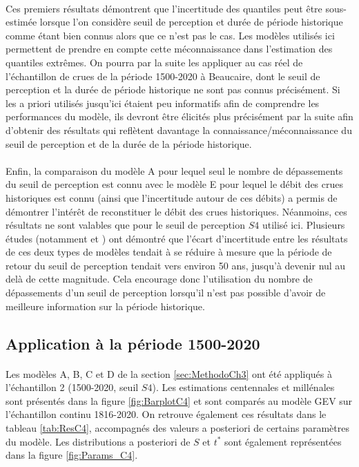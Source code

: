 \documentclass[11pt]{article}
\begin{document}
	\paragraph{} Ces premiers résultats démontrent que l'incertitude des quantiles peut être sous-estimée	lorsque l'on considère seuil de perception et durée de période historique comme étant bien connus alors que ce n'est pas le cas. Les modèles utilisés ici permettent de prendre en compte cette méconnaissance dans l'estimation des quantiles extrêmes. On pourra par la suite les appliquer au cas réel de l'échantillon de crues de la période 1500-2020 à Beaucaire, dont le seuil de perception et la durée de période historique ne sont pas connus précisément. Si les a priori utilisés jusqu'ici étaient peu informatifs afin de comprendre les performances du modèle, ils devront être élicités plus précisément par la suite afin d'obtenir des résultats qui reflètent davantage la connaissance/méconnaissance du seuil de perception et de la durée de la période historique.
		
	\paragraph{} Enfin, la comparaison du modèle A pour lequel seul le nombre de dépassements du seuil de perception est connu avec le modèle E pour lequel le débit des crues historiques est connu (ainsi que l'incertitude autour de ces débits) a permis de démontrer l'intérêt de reconstituer le débit des crues historiques. Néanmoins, ces résultats ne sont valables que pour le seuil de perception $S4$ utilisé ici. Plusieurs études (notamment \citet{stedinger_flood_1986} et \citet{payrastre_usefulness_2011}) ont démontré que l'écart d'incertitude entre les résultats de ces deux types de modèles tendait à se réduire à mesure que la période de retour du seuil de perception tendait vers environ 50 ans, jusqu'à devenir nul au delà de cette magnitude. Cela encourage donc l'utilisation du nombre de dépassements d'un seuil de perception lorsqu'il n'est pas possible d'avoir de meilleure information sur la période historique.
	
	\subsection{Application à la période 1500-2020}
	\label{subsec:Results1500}
	
	\paragraph{} Les modèles A, B, C et D de la section \ref{sec:MethodoCh3} ont été appliqués à l'échantillon 2 (1500-2020, seuil $S4$). Les estimations centennales et millénales sont présentés dans la figure \ref{fig:BarplotC4} et sont comparés au modèle GEV sur l'échantillon continu 1816-2020. On retrouve également ces résultats dans le tableau \ref{tab:ResC4}, accompagnés des valeurs a posteriori de certains paramètres du modèle. Les distributions a posteriori de $S$ et $t^{*}$ sont également représentées dans la figure \ref{fig:Params_C4}.
	
\end{document}
